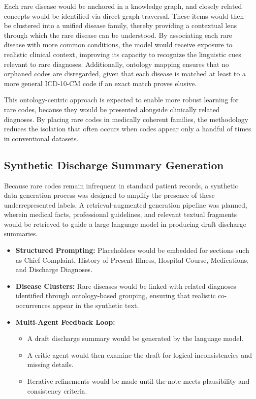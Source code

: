 Each rare disease would be anchored in a knowledge graph, and closely related concepts would be identified via direct graph traversal. These items would then be clustered into a unified disease family, thereby providing a contextual lens through which the rare disease can be understood. By associating each rare disease with more common conditions, the model would receive exposure to realistic clinical context, improving its capacity to recognize the linguistic cues relevant to rare diagnoses. Additionally, ontology mapping ensures that no orphaned codes are disregarded, given that each disease is matched at least to a more general ICD-10-CM code if an exact match proves elusive.

This ontology-centric approach is expected to enable more robust learning for rare codes, because they would be presented alongside clinically related diagnoses. By placing rare codes in medically coherent families, the methodology reduces the isolation that often occurs when codes appear only a handful of times in conventional datasets.

\subsection{Synthetic Discharge Summary Generation}\label{sec:p1:synthetic_generation}
Because rare codes remain infrequent in standard patient records, a synthetic data generation process was designed to amplify the presence of these underrepresented labels. A retrieval-augmented generation pipeline was planned, wherein medical facts, professional guidelines, and relevant textual fragments would be retrieved to guide a large language model in producing draft discharge summaries.

\begin{itemize}
    \item \textbf{Structured Prompting:} Placeholders would be embedded for sections such as Chief Complaint, History of Present Illness, Hospital Course, Medications, and Discharge Diagnoses.
    \item \textbf{Disease Clusters:} Rare diseases would be linked with related diagnoses identified through ontology-based grouping, ensuring that realistic co-occurrences appear in the synthetic text.
    \item \textbf{Multi-Agent Feedback Loop:}
    \begin{itemize}
        \item A draft discharge summary would be generated by the language model.
        \item A critic agent would then examine the draft for logical inconsistencies and missing details.
        \item Iterative refinements would be made until the note meets plausibility and consistency criteria.
    \end{itemize}
\end{itemize}

